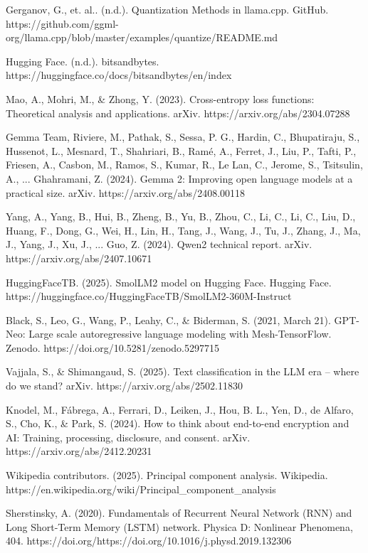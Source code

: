 \documentclass[licencjacka,en]{pracamgr}
\begin{document}
\begin{thebibliography}{99}
Gerganov, G., et. al.. (n.d.). Quantization Methods in llama.cpp. GitHub. https://github.com/ggml-org/llama.cpp/blob/master/examples/quantize/README.md

Hugging Face. (n.d.). bitsandbytes. https://huggingface.co/docs/bitsandbytes/en/index

Mao, A., Mohri, M., \& Zhong, Y. (2023). Cross-entropy loss functions: Theoretical analysis and applications. arXiv. https://arxiv.org/abs/2304.07288

Gemma Team, Riviere, M., Pathak, S., Sessa, P. G., Hardin, C., Bhupatiraju, S., Hussenot, L., Mesnard, T., Shahriari, B., Ramé, A., Ferret, J., Liu, P., Tafti, P., Friesen, A., Casbon, M., Ramos, S., Kumar, R., Le Lan, C., Jerome, S., Tsitsulin, A., ... Ghahramani, Z. (2024). Gemma 2: Improving open language models at a practical size. arXiv. https://arxiv.org/abs/2408.00118

Yang, A., Yang, B., Hui, B., Zheng, B., Yu, B., Zhou, C., Li, C., Li, C., Liu, D., Huang, F., Dong, G., Wei, H., Lin, H., Tang, J., Wang, J., Tu, J., Zhang, J., Ma, J., Yang, J., Xu, J., ... Guo, Z. (2024). Qwen2 technical report. arXiv. https://arxiv.org/abs/2407.10671

HuggingFaceTB. (2025). SmolLM2 model on Hugging Face. Hugging Face. https://huggingface.co/HuggingFaceTB/SmolLM2-360M-Instruct

Black, S., Leo, G., Wang, P., Leahy, C., \& Biderman, S. (2021, March 21). GPT-Neo: Large scale autoregressive language modeling with Mesh-TensorFlow. Zenodo. https://doi.org/10.5281/zenodo.5297715

Vajjala, S., \& Shimangaud, S. (2025). Text classification in the LLM era – where do we stand? arXiv. https://arxiv.org/abs/2502.11830

Knodel, M., Fábrega, A., Ferrari, D., Leiken, J., Hou, B. L., Yen, D., de Alfaro, S., Cho, K., \& Park, S. (2024). How to think about end-to-end encryption and AI: Training, processing, disclosure, and consent. arXiv. https://arxiv.org/abs/2412.20231

Wikipedia contributors. (2025). Principal component analysis. Wikipedia. https://en.wikipedia.org/wiki/Principal\_component\_analysis

Sherstinsky, A. (2020). Fundamentals of Recurrent Neural Network (RNN) and Long Short-Term Memory (LSTM) network. Physica D: Nonlinear Phenomena, 404. https://doi.org/https://doi.org/10.1016/j.physd.2019.132306 


\end{thebibliography}
\end{document}
